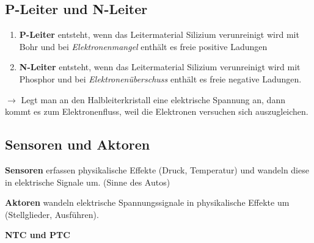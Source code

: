 \subsection{P-Leiter und N-Leiter}\label{p-leiter-und-n-leiter}

\begin{enumerate}
\item
  \textbf{P-Leiter} entsteht, wenn das Leitermaterial Silizium
  verunreinigt wird mit Bohr und bei \emph{Elektronenmangel} enthält es
  freie positive Ladungen
\item
  \textbf{N-Leiter} entsteht, wenn das Leitermaterial Silizium
  verunreinigt wird mit Phosphor und bei \emph{Elektronenüberschuss}
  enthält es freie negative Ladungen.
\end{enumerate}

$\to$ Legt man an den Halbleiterkristall eine elektrische Spannung an,
dann kommt es zum Elektronenfluss, weil die Elektronen versuchen sich
auszugleichen.

\subsection{Sensoren und Aktoren}\label{sensoren-und-aktoren}

\textbf{Sensoren} erfassen physikalische Effekte (Druck, Temperatur) und
wandeln diese in elektrische Signale um. (Sinne des Autos)

\textbf{Aktoren} wandeln elektrische Spannungssignale in physikalische
Effekte um (Stellglieder, Ausführen).

\textbf{NTC und PTC}


